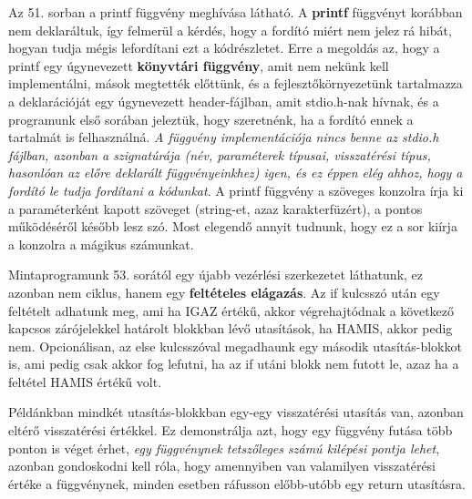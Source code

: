 Az 51. sorban a printf függvény meghívása látható. A \textbf{printf} függvényt korábban nem deklaráltuk, így felmerül a kérdés, hogy a fordító miért nem jelez rá hibát, hogyan tudja mégis lefordítani ezt a kódrészletet. Erre a megoldás az, hogy a printf egy úgynevezett \textbf{könyvtári függvény}, amit nem nekünk kell implementálni, mások megtették előttünk, és a fejlesztőkörnyezetünk tartalmazza a deklarációját egy úgynevezett header-fájlban, amit stdio.h-nak hívnak, és a programunk első sorában jeleztük, hogy szeretnénk, ha a fordító ennek a tartalmát is felhasználná. \emph{A függvény implementációja nincs benne az stdio.h fájlban, azonban a szignatúrája (név, paraméterek típusai, visszatérési típus, hasonlóan az előre deklarált függvényeinkhez) igen, és ez éppen elég ahhoz, hogy a fordító le tudja fordítani a kódunkat}. A printf függvény a szöveges konzolra írja ki a paraméterként kapott szöveget (string-et, azaz karakterfüzért), a pontos működéséről később lesz szó. Most elegendő annyit tudnunk, hogy ez a sor kiírja a konzolra a mágikus számunkat.

Mintaprogramunk 53. sorától egy újabb vezérlési szerkezetet láthatunk, ez azonban nem ciklus, hanem egy \textbf{feltételes elágazás}. Az if kulcsszó után egy feltételt adhatunk meg, ami ha IGAZ értékű, akkor végrehajtódnak a következő kapcsos zárójelekkel határolt blokkban lévő utasítások, ha HAMIS, akkor pedig nem.
Opcionálisan, az else kulcsszóval megadhaunk egy második utasítás-blokkot is, ami pedig csak akkor fog lefutni, ha az if utáni blokk nem futott le, azaz ha a feltétel HAMIS értékű volt.

Példánkban mindkét utasítás-blokkban egy-egy visszatérési utasítás van, azonban eltérő visszatérési értékkel. Ez demonstrálja azt, hogy egy függvény futása több ponton is véget érhet, \emph{egy függvénynek tetszőleges számú kilépési pontja lehet}, azonban gondoskodni kell róla, hogy amennyiben van valamilyen visszatérési értéke a függvénynek, minden esetben ráfusson előbb-utóbb egy return utasításra.



